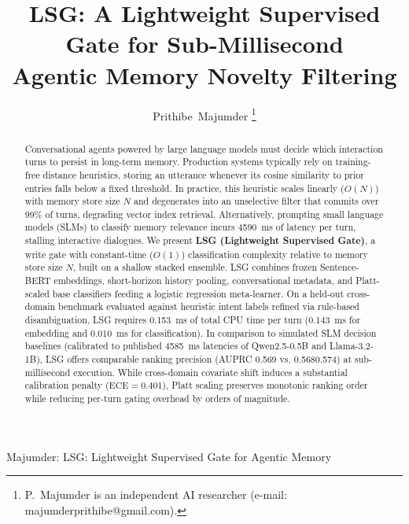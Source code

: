 \documentclass[journal]{IEEEtran}
\begin{document}
\raggedbottom

\title{LSG: A Lightweight Supervised Gate for Sub-Millisecond\\Agentic Memory Novelty Filtering}

\author{Prithibe~Majumder%
\thanks{\raggedright P.~Majumder is an independent AI researcher (e-mail: majumderprithibe@gmail.com).}%
}

%
{Majumder: LSG: Lightweight Supervised Gate for Agentic Memory}

\maketitle

\begin{abstract}
Conversational agents powered by large language models must decide which interaction turns to persist in long-term memory. Production systems typically rely on training-free distance heuristics, storing an utterance whenever its cosine similarity to prior entries falls below a fixed threshold. In practice, this heuristic scales linearly ($O(N)$) with memory store size $N$ and degenerates into an unselective filter that commits over 99\% of turns, degrading vector index retrieval. Alternatively, prompting small language models (SLMs) to classify memory relevance incurs 45\text{--}90~ms of latency per turn, stalling interactive dialogues. We present \textbf{LSG (Lightweight Supervised Gate)}, a write gate with constant-time ($O(1)$) classification complexity relative to memory store size $N$, built on a shallow stacked ensemble. LSG combines frozen Sentence-BERT embeddings, short-horizon history pooling, conversational metadata, and Platt-scaled base classifiers feeding a logistic regression meta-learner. On a held-out cross-domain benchmark evaluated against heuristic intent labels refined via rule-based disambiguation, LSG requires 0.153~ms of total CPU time per turn (0.143~ms for embedding and 0.010~ms for classification). In comparison to simulated SLM decision baselines (calibrated to published 45\text{--}85~ms latencies of Qwen2.5-0.5B and Llama-3.2-1B), LSG offers comparable ranking precision (AUPRC 0.569 vs. 0.568\text{--}0.574) at sub-millisecond execution. While cross-domain covariate shift induces a substantial calibration penalty ($\text{ECE} = 0.401$), Platt scaling preserves monotonic ranking order while reducing per-turn gating overhead by orders of magnitude.
\end{abstract}
\end{document}
